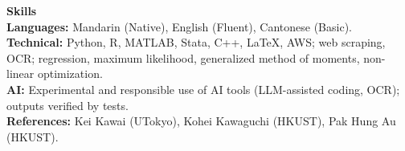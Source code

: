\documentclass[11pt,letterpaper]{article}
\begin{document}
\vspace{1pt}

{\large \textbf{Skills}}\\[1pt]
\textbf{Languages:} Mandarin (Native), English (Fluent), Cantonese (Basic).\\
\textbf{Technical:} Python, R, MATLAB, Stata, C++, \LaTeX, AWS; web scraping, OCR; regression, maximum likelihood, generalized method of moments, non-linear optimization.\\
\textbf{AI:} Experimental and responsible use of AI tools (LLM-assisted coding, OCR); outputs verified by tests.\\
\textbf{References:} Kei Kawai (UTokyo), Kohei Kawaguchi (HKUST), Pak Hung Au (HKUST).
\end{document}
